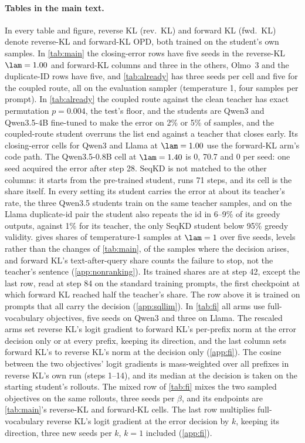 \paragraph{Tables in the main text.}
In every table and figure, reverse KL (rev.\ KL) and forward KL (fwd.\ KL) denote reverse-KL and forward-KL OPD, both trained on the student's own samples.
In \cref{tab:main} the closing-error rows have five seeds in the reverse-KL $\lam=1.00$ and forward-KL columns and three in the others, Olmo~3 and the duplicate-ID rows have five, and \cref{tab:already} has three seeds per cell and five for the coupled route, all on the evaluation sampler (temperature 1, four samples per prompt). In \cref{tab:already} the coupled route against the clean teacher has exact permutation $p=0.004$, the test's floor, and the students are Qwen3 and Qwen3.5-4B fine-tuned to make the error on 2\% or 5\% of samples, and the coupled-route student overruns the list end against a teacher that closes early.
Its closing-error cells for Qwen3 and Llama at $\lam=1.00$ use the forward-KL arm's code path.
The Qwen3.5-0.8B cell at $\lam=1.40$ is 0, 70.7 and 0 per seed: one seed acquired the error after step 28.
SeqKD is not matched to the other columns: it starts from the pre-trained student, runs 71 steps, and its cell is the share itself. In every setting its student carries the error at about its teacher's rate, the three Qwen3.5 students train on the same teacher samples, and on the Llama duplicate-id pair the student also repeats the id in 6--9\% of its greedy outputs, against 1\% for its teacher, the only SeqKD student below 95\% greedy validity.
 gives shares of temperature-1 samples at $\lam=1$ over five seeds, levels rather than the changes of \cref{tab:main}, of the samples where the decision arises, and forward KL's text-after-query share counts the failure to stop, not the teacher's sentence (\cref{app:nonranking}). Its trained shares are at step 42, except the last row, read at step 84 on the standard training prompts, the first checkpoint at which forward KL reached half the teacher's share. The row above it is trained on prompts that all carry the decision (\cref{app:sqllim}).
In \cref{tab:fi} all arms use full-vocabulary objectives, five seeds on Qwen3 and three on Llama. The rescaled arms set reverse KL's logit gradient to forward KL's per-prefix norm at the error decision only or at every prefix, keeping its direction, and the last column sets forward KL's to reverse KL's norm at the decision only (\cref{app:fi}). The cosine between the two objectives' logit gradients is mass-weighted over all prefixes in reverse KL's own run (steps 1--14), and its median at the decision is taken on the starting student's rollouts. The mixed row of \cref{tab:fi} mixes the two sampled objectives on the same rollouts, three seeds per $\beta$, and its endpoints are \cref{tab:main}'s reverse-KL and forward-KL cells. The last row multiplies full-vocabulary reverse KL's logit gradient at the error decision by $k$, keeping its direction, three new seeds per $k$, $k=1$ included (\cref{app:fi}).


